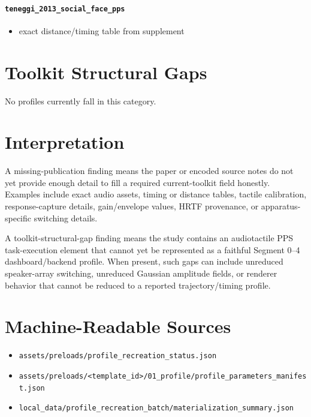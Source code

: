 \documentclass[11pt]{article}
\begin{document}
\paragraph{\texttt{teneggi\_\allowbreak{}2013\_\allowbreak{}social\_\allowbreak{}face\_\allowbreak{}pps}}
\begin{itemize}
\item exact distance/timing table from supplement
\end{itemize}

\section*{Toolkit Structural Gaps}
No profiles currently fall in this category.

\section*{Interpretation}
A missing-publication finding means the paper or encoded source notes do not yet provide enough detail to fill a required current-toolkit field honestly. Examples include exact audio assets, timing or distance tables, tactile calibration, response-capture details, gain/envelope values, HRTF provenance, or apparatus-specific switching details.

A toolkit-structural-gap finding means the study contains an audiotactile PPS task-execution element that cannot yet be represented as a faithful Segment 0--4 dashboard/backend profile. When present, such gaps can include unreduced speaker-array switching, unreduced Gaussian amplitude fields, or renderer behavior that cannot be reduced to a reported trajectory/timing profile.

\section*{Machine-Readable Sources}
\begin{itemize}
\item \texttt{assets/preloads/profile\_recreation\_status.json}
\item \texttt{assets/preloads/<template\_id>/01\_profile/profile\_parameters\_manifest.json}
\item \texttt{local\_data/profile\_recreation\_batch/materialization\_summary.json}
\end{itemize}
\end{document}
